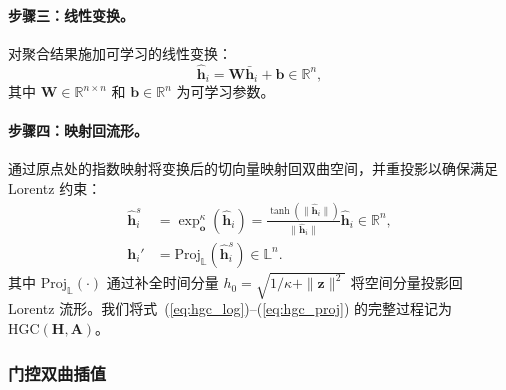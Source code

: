\paragraph{步骤三：线性变换。} 对聚合结果施加可学习的线性变换：
\begin{equation}
    \hat{\mathbf{h}}_i = \mathbf{W} \bar{\mathbf{h}}_i + \mathbf{b}
    \in \mathbb{R}^{n},
    \label{eq:hgc_linear}
\end{equation}
其中 $\mathbf{W} \in \mathbb{R}^{n \times n}$ 和 $\mathbf{b} \in \mathbb{R}^{n}$ 为可学习参数。

\paragraph{步骤四：映射回流形。} 通过原点处的指数映射将变换后的切向量映射回双曲空间，并重投影以确保满足 Lorentz 约束：
\begin{align}
    \hat{\mathbf{h}}_i^{s} &= \exp_{\mathbf{o}}^{\kappa}(\hat{\mathbf{h}}_i)
    = \frac{\tanh(\|\hat{\mathbf{h}}_i\|)}{\|\hat{\mathbf{h}}_i\|} \hat{\mathbf{h}}_i
    \in \mathbb{R}^{n}, \label{eq:hgc_exp} \\[4pt]
    \mathbf{h}_i' &= \text{Proj}_{\mathbb{L}}\!\left(\hat{\mathbf{h}}_i^{s}\right)
    \in \mathbb{L}^{n}. \label{eq:hgc_proj}
\end{align}
其中 $\text{Proj}_{\mathbb{L}}(\cdot)$ 通过补全时间分量 $h_0 = \sqrt{1/\kappa + \|\mathbf{z}\|^2}$ 将空间分量投影回 Lorentz 流形。我们将式~(\ref{eq:hgc_log})--(\ref{eq:hgc_proj}) 的完整过程记为 $\text{HGC}(\mathbf{H}, \mathbf{A})$。

\subsubsection{门控双曲插值}

